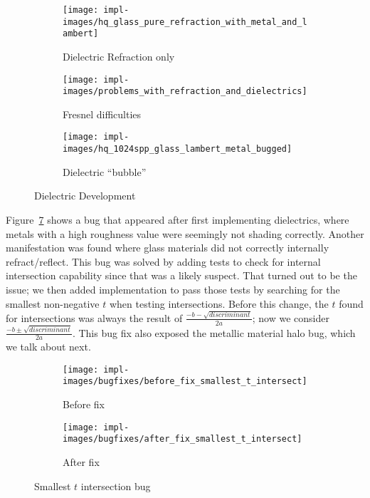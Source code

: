 \vspace{0.3em}
\begin{figure}[htb]
  \centering
  \begin{subfigure}[htb]{0.3\textwidth}
    \texttt{[image: impl-images/hq\_glass\_pure\_refraction\_with\_metal\_and\_lambert]}
    \caption{Dielectric Refraction only}
\label{fig:rayterm-cpu_dielectric_pure_refraction}
  \end{subfigure}
  \begin{subfigure}[htb]{0.3\textwidth}
    \texttt{[image: impl-images/problems\_with\_refraction\_and\_dielectrics]}
    \caption{Fresnel difficulties}
\label{fig:rayterm-cpu_dielectric_frensel_difficulties}
  \end{subfigure}
  \begin{subfigure}[htb]{0.3\textwidth}
    \texttt{[image: impl-images/hq\_1024spp\_glass\_lambert\_metal\_bugged]}
    \caption{Dielectric ``bubble''}
\label{fig:rayterm-cpu_dielectric_metallic_bug}
  \end{subfigure}
  \caption{Dielectric Development}
\label{fig:rayterm-cpu_dielectric_development}
\end{figure}

Figure~\ref{fig:rayterm-cpu_t_intersection_bug} shows a bug that appeared after first implementing dielectrics, where metals with a high roughness value were seemingly not shading correctly.
Another manifestation was found where glass materials did not correctly internally refract/reflect.
This bug was solved by adding tests to check for internal intersection capability since that was a likely suspect.
That turned out to be the issue; we then added implementation to pass those tests by searching for the smallest non-negative $t$ when testing intersections.
Before this change, the $t$ found for intersections was always the result of $\frac{-b - \sqrt{discriminant}}{2a}$; now we consider $\frac{-b \pm \sqrt{discriminant}}{2a}$.
This bug fix also exposed the metallic material halo bug, which we talk about next.

\vspace{0.3em}
\begin{figure}[htb]
  \centering
  \begin{subfigure}[htb]{0.45\textwidth}
    \texttt{[image: impl-images/bugfixes/before\_fix\_smallest\_t\_intersect]}
    \caption{Before fix}
\label{fig:rayterm-cpu_t_intersection_before}
  \end{subfigure}
  \begin{subfigure}[htb]{0.45\textwidth}
    \texttt{[image: impl-images/bugfixes/after\_fix\_smallest\_t\_intersect]}
    \caption{After fix}
\label{fig:rayterm-cpu_t_intersection_after}
  \end{subfigure}
  \caption{Smallest $t$ intersection bug}
\label{fig:rayterm-cpu_t_intersection_bug}
\end{figure}


